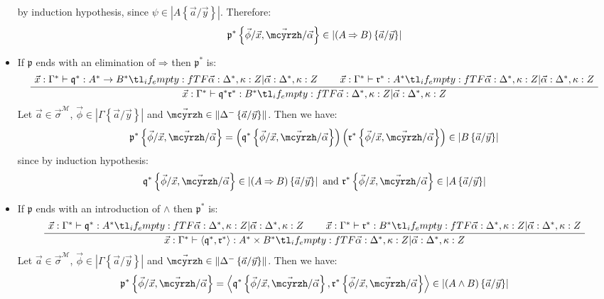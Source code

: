 \documentclass{CSML}
\newcommand*\ifpresent[3]{\tl_if_empty:fTF{#1}{#3}{#2}}
\newcommand*\AXM[1]{\AxiomC{$#1$}}
\newcommand*\BIM[1]{\BinaryInfC{$#1$}}
\newcommand*\DP\DisplayProof
\newcommand*\Entails{\mathrel{\vdash}}
\newcommand*\BarSep{\mathrel{|}}
\newcommand*\Sequent[3]{#1\Entails#2\ifpresent{#3}{\BarSep}{}#3}
\newcommand*\SortA{\sigma}
\newcommand*\LogVarB{y}
\newcommand*\LogNeg[1]{{#1^-}}
\newcommand*\LogImp{\mathbin{\Rightarrow}}
\newcommand*\LogAnd{\mathbin{\wedge}}
\newcommand*\LogFormA{A}
\newcommand*\LogFormB{B}
\newcommand*\LogProofA{\mathfrak{p}}
\newcommand*\LogProofB{\mathfrak{q}}
\newcommand*\LogProofC{\mathfrak{r}}
\newcommand*\LogSubst[1]{\left\{#1\right\}}
\newcommand*\ModM{\mathcal{M}}
\newcommand*\ModElemA{a}
\newcommand*\ModMInterp[1]{{#1}^\ModM}
\newcommand*\LmSortExtract{Z}
\newcommand*\LmSortTo\to
\newcommand*\LmTerm[2]{#1\mathrel{:}#2}
\newcommand*\LmVarA{x}
\newcommand*\LmMVarA\alpha
\newcommand*\LmPair[2]{\left\langle#1,#2\right\rangle}
\newcommand*\LmRuleImpElimFirst[6]{\Sequent{#1}{\LmTerm{#3}{#6\LmSortTo#4}}{#2}}
\newcommand*\LmRuleImpElimSecond[6]{\Sequent{#1}{\LmTerm{#5}{#6}}{#2}}
\newcommand*\LmRuleImpElimConcl[6]{\Sequent{#1}{\LmTerm{#3#5}{#4}}{#2}}
\newcommand*\LmRuleImpElim[6]{\AXM{\LmRuleImpElimFirst{#1}{#2}{#3}{#4}{#5}{#6}}\AXM{\LmRuleImpElimSecond{#1}{#2}{#3}{#4}{#5}{#6}}\BIM{\LmRuleImpElimConcl{#1}{#2}{#3}{#4}{#5}{#6}}\DP}
\newcommand*\LmRuleAndIntroFirst[6]{\Sequent{#1}{\LmTerm{#3}{#4}}{#2}}
\newcommand*\LmRuleAndIntroSecond[6]{\Sequent{#1}{\LmTerm{#5}{#6}}{#2}}
\newcommand*\LmRuleAndIntroConcl[6]{\Sequent{#1}{\LmTerm{\LmPair{#3}{#5}}{#4\times#6}}{#2}}
\newcommand*\LmRuleAndIntro[6]{\AXM{\LmRuleAndIntroFirst{#1}{#2}{#3}{#4}{#5}{#6}}\AXM{\LmRuleAndIntroSecond{#1}{#2}{#3}{#4}{#5}{#6}}\BIM{\LmRuleAndIntroConcl{#1}{#2}{#3}{#4}{#5}{#6}}\DP}
\newcommand*\LmInterpForm[1]{{#1}^*}
\newcommand*\LmInterpProof[1]{{#1}^*}
\newcommand*\CatRCHomA\phi
\newcommand*\CatRCHomB\psi
\newcommand*\CatCHomA\mcyrzh
\newcommand*\RealValNeg[1]{\left\|#1\right\|}
\newcommand*\RealVal[1]{\left|#1\right|}
\begin{document}
\begin{itemize}
by induction hypothesis, since $\CatRCHomB\in\RealVal{\LogFormA\LogSubst{\vec{\ModElemA}/\vec{\LogVarB}}}$. Therefore:
$$\LmInterpProof{\LogProofA}\LogSubst{\vec{\CatRCHomA}/\vec{\LmVarA},\vec{\CatCHomA}/\vec{\LmMVarA}}\in\RealVal{\left(\LogFormA\LogImp\LogFormB\right)\LogSubst{\vec{\ModElemA}/\vec{\LogVarB}}}$$
\item If $\LogProofA$ ends with an elimination of $\LogImp$ then $\LmInterpProof{\LogProofA}$ is:
$$\LmRuleImpElim{\LmTerm{\vec{\LmVarA}}{\LmInterpForm{\Gamma}}}{\LmTerm{\vec{\LmMVarA}}{\LmInterpForm{\Delta}},\LmTerm{\kappa}{\LmSortExtract}}{\LmInterpProof{\LogProofB}}{\LmInterpForm{\LogFormB}}{\LmInterpProof{\LogProofC}}{\LmInterpForm{\LogFormA}}$$
Let $\vec{\ModElemA}\in\ModMInterp{\vec{\SortA}}$, $\vec{\CatRCHomA}\in\RealVal{\Gamma\LogSubst{\vec{\ModElemA}/\vec{\LogVarB}}}$ and $\vec{\CatCHomA}\in\RealValNeg{\LogNeg{\Delta}\LogSubst{\vec{\ModElemA}/\vec{\LogVarB}}}$. Then we have:
$$\LmInterpProof{\LogProofA}\LogSubst{\vec{\CatRCHomA}/\vec{\LmVarA},\vec{\CatCHomA}/\vec{\LmMVarA}}=\left(\LmInterpProof{\LogProofB}\LogSubst{\vec{\CatRCHomA}/\vec{\LmVarA},\vec{\CatCHomA}/\vec{\LmMVarA}}\right)\left(\LmInterpProof{\LogProofC}\LogSubst{\vec{\CatRCHomA}/\vec{\LmVarA},\vec{\CatCHomA}/\vec{\LmMVarA}}\right)\in\RealVal{\LogFormB\LogSubst{\vec{\ModElemA}/\vec{\LogVarB}}}$$
since by induction hypothesis:
$$\LmInterpProof{\LogProofB}\LogSubst{\vec{\CatRCHomA}/\vec{\LmVarA},\vec{\CatCHomA}/\vec{\LmMVarA}}\in\RealVal{\left(\LogFormA\LogImp\LogFormB\right)\LogSubst{\vec{\ModElemA}/\vec{\LogVarB}}}\text{ and }\LmInterpProof{\LogProofC}\LogSubst{\vec{\CatRCHomA}/\vec{\LmVarA},\vec{\CatCHomA}/\vec{\LmMVarA}}\in\RealVal{\LogFormA\LogSubst{\vec{\ModElemA}/\vec{\LogVarB}}}$$
\item If $\LogProofA$ ends with an introduction of $\LogAnd$ then $\LmInterpProof{\LogProofA}$ is:
$$\LmRuleAndIntro{\LmTerm{\vec{\LmVarA}}{\LmInterpForm{\Gamma}}}{\LmTerm{\vec{\LmMVarA}}{\LmInterpForm{\Delta}},\LmTerm{\kappa}{\LmSortExtract}}{\LmInterpProof{\LogProofB}}{\LmInterpForm{\LogFormA}}{\LmInterpProof{\LogProofC}}{\LmInterpForm{\LogFormB}}$$
Let $\vec{\ModElemA}\in\ModMInterp{\vec{\SortA}}$, $\vec{\CatRCHomA}\in\RealVal{\Gamma\LogSubst{\vec{\ModElemA}/\vec{\LogVarB}}}$ and $\vec{\CatCHomA}\in\RealValNeg{\LogNeg{\Delta}\LogSubst{\vec{\ModElemA}/\vec{\LogVarB}}}$. Then we have:
$$\LmInterpProof{\LogProofA}\LogSubst{\vec{\CatRCHomA}/\vec{\LmVarA},\vec{\CatCHomA}/\vec{\LmMVarA}}=\LmPair{\LmInterpProof{\LogProofB}\LogSubst{\vec{\CatRCHomA}/\vec{\LmVarA},\vec{\CatCHomA}/\vec{\LmMVarA}}}{\LmInterpProof{\LogProofC}\LogSubst{\vec{\CatRCHomA}/\vec{\LmVarA},\vec{\CatCHomA}/\vec{\LmMVarA}}}\in\RealVal{\left(\LogFormA\LogAnd\LogFormB\right)\LogSubst{\vec{\ModElemA}/\vec{\LogVarB}}}$$

\end{itemize}
\end{document}
